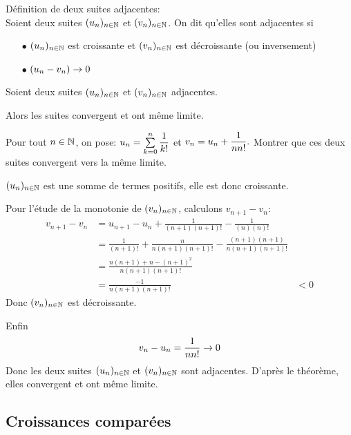 \documentclass[a4paper, 11pt]{article}
\begin{document}
\begin{defi} D\'efinition de deux suites adjacentes: \\
 Soient deux suites $(u_n)_{n\in \mathbb{N}}$ et $(v_n)_{n\in \mathbb{N}}$. On dit qu'elles sont adjacentes si \vspace{0.3cm}
\begin{itemize}
\item[$\bullet$]$(u_n)_{n\in \mathbb{N}}$ est croissante et $(v_n)_{n\in \mathbb{N}}$ est décroissante (ou inversement) 
\item[$\bullet$] $(u_n -v_n )\rightarrow 0$
\end{itemize}
\end{defi}


\begin{theorem} 
Soient deux suites $(u_n)_{n\in \mathbb{N}}$ et $(v_n)_{n\in \mathbb{N}}$ adjacentes. 

Alors les suites convergent et ont même limite. 

\end{theorem}


{\footnotesize 
\begin{exercice} 
Pour tout $n\in\mathbb{N}$, on pose: $u_n=\sum\limits_{k=0}^n \displaystyle\frac{1}{k!}$ et $v_n=u_n+\displaystyle\frac{1}{nn!}.$
Montrer que ces deux suites convergent vers la m\^{e}me limite.
\end{exercice}}
\begin{cor}
$(u_n)_{n\in \mathbb{N}}$ est une somme de termes positifs, elle est donc croissante. 

Pour l'étude de la monotonie de $(v_n)_{n\in \mathbb{N}}$, calculons $v_{n+1}-v_n$:
\begin{align*}
v_{n+1}-v_n&= u_{n+1}-u_n + \frac{1}{(n+1) (n+1)! } - \frac{1}{(n) (n)! } \\
				&= \frac{1}{(n+1)!} + \frac{n}{n(n+1) (n+1)! } - \frac{(n+1)(n+1)}{n (n+1) (n+1)!}\\
				&= \frac{n(n+1) + n - (n+1)^2}{n(n+1)(n+1)!}\\
				&= \frac{ -1 }{n(n+1)(n+1)!}
				&<0
\end{align*}
Donc $(v_n)_{n\in \mathbb{N}}$ est décroissante. 

Enfin 
$$v_n-u_n = \frac{1}{n n! }\rightarrow 0$$
Donc les deux suites $(u_n)_{n\in \mathbb{N}}$ et $(v_n)_{n\in \mathbb{N}}$ sont adjacentes. D'après le théorème, elles convergent et ont même limite. 



\end{cor}

\subsection{Croissances comparées}
\end{document}
